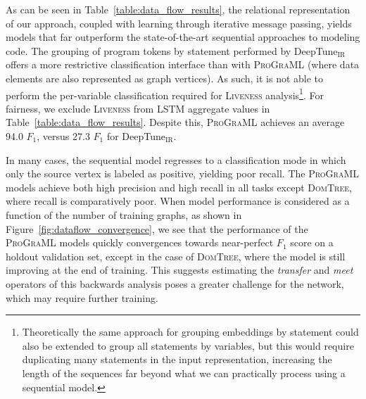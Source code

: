 As can be seen in Table~\ref{table:data_flow_results}, the relational
representation of our approach, coupled with learning through
iterative message passing, yields models that far outperform the
state-of-the-art sequential approaches to modeling code.  The grouping
of program tokens by statement performed by DeepTune$_\text{IR}$
offers a more restrictive classification interface than with
\textsc{ProGraML} (where data elements are also represented as graph
vertices). As such, it is not able to perform the per-variable
classification required for \textsc{Liveness}
analysis\footnote{Theoretically the same approach for grouping
  embeddings by statement could also be extended to group all
  statements by variables, but this would require duplicating many
  statements in the input representation, increasing the length of the
  sequences far beyond what we can practically process using a
  sequential model.}. For fairness, we exclude \textsc{Liveness} from
LSTM aggregate values in Table~\ref{table:data_flow_results}. Despite
this, \textsc{ProGraML} achieves an average 94.0 $F_1$, versus 27.3
$F_1$ for DeepTune$_\text{IR}$.

In many cases, the sequential model regresses to a classification mode
in which only the source vertex is labeled as positive, yielding poor
recall.  The \textsc{ProGraML} models achieve both high precision and
high recall in all tasks except \textsc{DomTree}, where recall is
comparatively poor. When model performance is considered as a function
of the number of training graphs, as shown in
Figure~\ref{fig:dataflow_convergence}, we see that the performance of
the \textsc{ProGraML} models quickly convergences towards near-perfect
$F_1$ score on a holdout validation set, except in the case of
\textsc{DomTree}, where the model is still improving at the end of
training. This suggests estimating the \emph{transfer} and \emph{meet}
operators of this backwards analysis poses a greater challenge for the
network, which may require further training.

